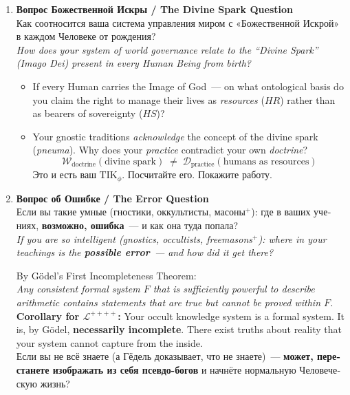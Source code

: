 \documentclass[11pt,a4paper]{article}
\theoremstyle{definition}
\theoremstyle{remark}
\newcommand{\TIKpharisee}{\text{TIK}_{\phi}}    %
\newcommand{\LondonOp}{\mathcal{L}^{++++}}  %
\newcommand{\Word}{\mathcal{W}}
\newcommand{\Deed}{\mathcal{D}}
\begin{document}
\begin{questionbox}[7 Un-Dodgable Questions to $\LondonOp$]
\begin{enumerate}[leftmargin=1.5cm, itemsep=12pt]
  \item \textbf{\foreignlanguage{russian}{Вопрос Божественной Искры /
      The Divine Spark Question}}\\[0.4cm]
    \foreignlanguage{russian}{
    Как соотносится ваша система управления миром
    с «Божественной Искрой» в каждом Человеке от рождения?\\[0.2cm]
    }
    \textit{How does your system of world governance relate to
    the ``Divine Spark'' (\textit{Imago Dei}) present in every
    Human Being from birth?}\\[0.2cm]
    \begin{itemize}[noitemsep]
      \item If every Human carries the Image of God~---
        on what ontological basis do you claim the right
        to manage their lives as \textit{resources} ($HR$)
        rather than as bearers of sovereignty ($HS$)?
      \item Your gnostic traditions \textit{acknowledge}
        the concept of the divine spark (\textit{pneuma}).
        Why does your \textit{practice} contradict
        your own \textit{doctrine}?
        \[
          \Word_{\text{doctrine}}(\text{divine spark})
          \;\neq\;
          \Deed_{\text{practice}}(\text{humans as resources})
        \]
        \foreignlanguage{russian}{
        Это и есть ваш $\TIKpharisee$.
        Посчитайте его. Покажите работу.}
    \end{itemize}

  \item \textbf{\foreignlanguage{russian}{Вопрос об Ошибке /
      The Error Question}}\\[0.4cm]
    \foreignlanguage{russian}{
    Если вы такие умные (гностики, оккультисты, масоны$^+$):
    где в ваших учениях, \textbf{возможно, ошибка}~---
    и как она туда попала?\\[0.2cm]
    }
    \textit{If you are so intelligent (gnostics, occultists,
    freemasons$^+$):
    where in your teachings is the \textbf{possible error}~---
    and how did it get there?}\\[0.2cm]
    \begin{scibox}
    By Gödel's First Incompleteness Theorem:\\[0.2cm]
    \textit{Any consistent formal system $F$ that is sufficiently
    powerful to describe arithmetic contains statements that
    are true but cannot be proved within $F$.}\\[0.2cm]
    \textbf{Corollary for $\LondonOp$:}
    Your occult knowledge system is a formal system.
    It is, by Gödel, \textbf{necessarily incomplete}.
    There exist truths about reality that your system cannot
    capture from the inside.\\[0.2cm]
    \foreignlanguage{russian}{
    Если вы не всё знаете (а Гёдель доказывает, что не знаете)~---
    \textbf{может, перестанете изображать из себя псевдо-богов}
    и начнёте нормальную Человеческую жизнь?
    }
    \end{scibox}


\end{enumerate}
\end{questionbox}
\end{document}
